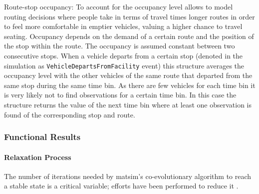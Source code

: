 \begin{compactitem}
%
\item Route-stop occupancy: To account for the occupancy level allows to model routing decisions where people take in terms of travel times longer routes in order to feel more comfortable in emptier vehicles, \eg valuing a higher chance to travel seating. Occupancy depends on the demand of a certain route and the position of the stop within the route. The occupancy is assumed constant between two consecutive stops. When a vehicle departs from a certain stop (denoted in the simulation as \lstinline|VehicleDepartsFromFacility| event) this structure averages the occupancy level with the other vehicles of the same route that departed from the same stop during the same time bin. As there are few vehicles for each time bin it is very likely not to find observations for a certain time bin. In this case the structure returns the value of the next time bin where at least one observation is found of the corresponding stop and route.
\end{compactitem}

\subsubsection{Functional Results}
\paragraph{Relaxation Process}

The number of iterations needed by \gls{matsim}'s co-evolutionary algorithm to reach a stable state is a critical variable; efforts have been performed to reduce it \citep{MeisterEtAl_STRC_2006, FourieEtAl_TRB_2013}.

